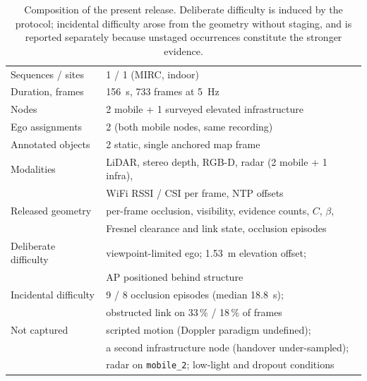 \begin{table}[t]
\centering
\caption{Composition of the present release. Deliberate difficulty is induced by
the protocol; incidental difficulty arose from the geometry without staging, and
is reported separately because unstaged occurrences constitute the stronger
evidence.}
\label{tab:inventory}
\small
\begin{tabular}{@{}ll@{}}
\toprule
Sequences / sites & 1 / 1 (MIRC, indoor) \\
Duration, frames & \SI{156}{\second}, \num{733} frames at \SI{5}{\hertz} \\
Nodes & 2 mobile + 1 surveyed elevated infrastructure \\
Ego assignments & 2 (both mobile nodes, same recording) \\
Annotated objects & 2 static, single anchored map frame \\
Modalities & LiDAR, stereo depth, RGB-D, radar (2 mobile + 1 infra), \\
          & WiFi RSSI / CSI per frame, NTP offsets \\
Released geometry & per-frame occlusion, visibility, evidence counts, $C$, $\beta$, \\
          & Fresnel clearance and link state, occlusion episodes \\
\midrule
Deliberate difficulty & viewpoint-limited ego; \SI{1.53}{\metre} elevation offset; \\
          & AP positioned behind structure \\
Incidental difficulty & 9 / 8 occlusion episodes (median \SI{18.8}{\second}); \\
          & obstructed link on 33\,\% / 18\,\% of frames \\
\midrule
Not captured & scripted motion (Doppler paradigm undefined); \\
          & a second infrastructure node (handover under-sampled); \\
          & radar on \texttt{mobile\_2}; low-light and dropout conditions \\
\bottomrule
\end{tabular}
\end{table}


